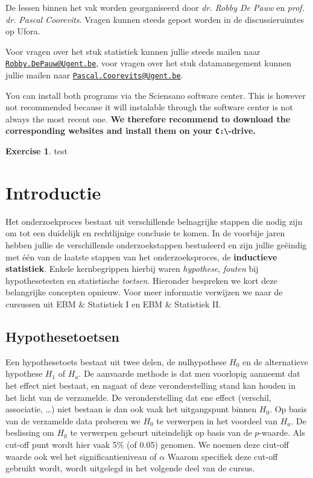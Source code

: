 \documentclass[
]{book}
\theoremstyle{definition}
\theoremstyle{definition}
\theoremstyle{definition}
\newtheorem{exercise}{Exercise}[chapter]
\theoremstyle{definition}
\theoremstyle{remark}
\begin{document}
De lessen binnen het vak worden georganiseerd door \emph{dr. Robby De Pauw} en \emph{prof. dr. Pascal Coorevits}. Vragen kunnen steeds gepost worden in de discussieruimtes op Ufora.

Voor vragen over het stuk statistiek kunnen jullie steeds mailen naar \href{mailto:Robby.DePauw@Ugent.be}{\nolinkurl{Robby.DePauw@Ugent.be}}, voor vragen over het stuk datamanegement kunnen jullie mailen naar \href{mailto:Pascal.Coorevits@Ugent.be}{\nolinkurl{Pascal.Coorevits@Ugent.be}}.

You can install both programs via the Sciensano software center. This is however not recommended because it will instalable through the software center is not always the most recent one. \textbf{We therefore recommend to download the corresponding websites and install them on your \texttt{C:\textbackslash{}}-drive.}

\begin{exercise}
test
\end{exercise}

\mainmatter

\hypertarget{intro}{%
\chapter{Introductie}\label{intro}}

Het onderzoekproces bestaat uit verschillende belnagrijke stappen die nodig zijn om tot een duidelijk en rechtlijnige conclusie te komen. In de voorbije jaren hebben jullie de verschillende onderzoekstappen bestudeerd en zijn jullie geëindig met één van de laatste stappen van het onderzoeksproces, de \textbf{inductieve statistiek}. Enkele kernbegrippen hierbij waren \emph{hypothese}, \emph{fouten} bij hypothesetesten en statistische \emph{toetsen}. Hieronder bespreken we kort deze belangrijke concepten opnieuw. Voor meer informatie verwijzen we naar de cursussen uit {EBM \& Statistiek I} en {EBM \& Statistiek II}.

\hypertarget{hypothesetoetsen}{%
\section*{Hypothesetoetsen}\label{hypothesetoetsen}}


Een hypothesetoets bestaat uit twee delen, de nulhypothese \(H_0\) en de alternatieve hypothese \(H_1\) of \(H_a\). De aanvaarde methode is dat men voorlopig aanneemt dat het effect niet bestaat, en nagaat of deze veronderstelling stand kan houden in het licht van de verzamelde. De veronderstelling dat ene effect (verschil, associatie, \ldots) niet bestaan is dan ook vaak het uitgangspunt binnen \(H_0\). Op basis van de verzamelde data proberen we \(H_0\) te verwerpen in het voordeel van \(H_a\). De beslissing om \(H_0\) te verwerpen gebeurt uiteindelijk op basis van de \(p\)-waarde. Als cut-off punt wordt hier vaak 5\% (of 0.05) genomen. We noemen deze ciut-off waarde ook wel het significantieniveau of \(\alpha\) Waarom specifiek deze cut-off gebruikt wordt, wordt uitgelegd in het volgende deel van de cursus.
\end{document}
